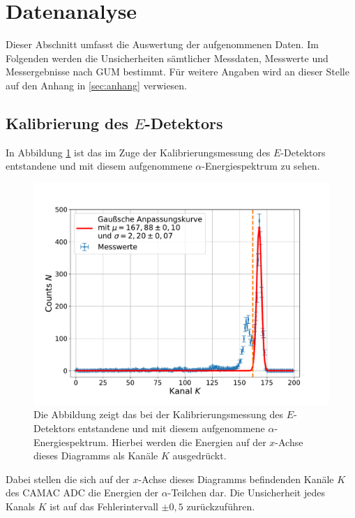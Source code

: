 \section{Datenanalyse}

Dieser Abschnitt umfasst die Auswertung der aufgenommenen Daten.
Im Folgenden werden die Unsicherheiten sämtlicher Messdaten, Messwerte und Messergebnisse nach GUM\cite{1} bestimmt.
Für weitere Angaben wird an dieser Stelle auf den Anhang in \cref{sec:anhang} verwiesen.

\subsection{Kalibrierung des $E$-Detektors} \label{KaliEDet}

In Abbildung \ref{EDetectorCalibrationChannelSpectrumEDetector} ist das im Zuge der Kalibrierungsmessung des $E$-Detektors entstandene und mit diesem aufgenommene $\alpha$-Energiespektrum zu sehen.
\begin{figure}[H]
	\centering
	\includegraphics[width=1.0\textwidth]{src/EDetectorCalibrationChannelSpectrumEDetector}
	\caption{Die Abbildung zeigt das bei der Kalibrierungsmessung des $E$-Detektors entstandene und mit diesem aufgenommene $\alpha$-Energiespektrum. Hierbei werden die Energien auf der $x$-Achse dieses Diagramms als Kanäle $K$ ausgedrückt.}
	\label{EDetectorCalibrationChannelSpectrumEDetector}
\end{figure}
\noindent Dabei stellen die sich auf der $x$-Achse dieses Diagramms befindenden Kanäle $K$ des CAMAC ADC die Energien der $\alpha$-Teilchen dar.
Die Unsicherheit jedes Kanals $K$ ist auf das Fehlerintervall $\pm 0,5$ zurückzuführen.
